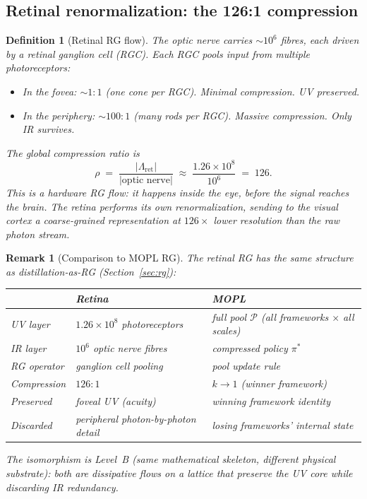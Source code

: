 \documentclass[11pt,a4paper]{article}
\newtheorem{definition}[theorem]{Definition}
\newtheorem{remark}[theorem]{Remark}
\newcommand{\cP}{\mathcal{P}}
\begin{document}
\subsection{Retinal renormalization: the 126:1 compression}
\label{app:retina-rg}

\begin{definition}[Retinal RG flow]\label{def:retina-rg}
The optic nerve carries $\sim\!10^6$ fibres, each driven
by a retinal ganglion cell (RGC).
Each RGC pools input from multiple photoreceptors:
\begin{itemize}[nosep]
\item In the fovea: $\sim\!1{:}1$ (one cone per RGC).
  Minimal compression.  UV preserved.
\item In the periphery: $\sim\!100{:}1$ (many rods per RGC).
  Massive compression.  Only IR survives.
\end{itemize}
The global compression ratio is
\[
  \rho
    \;=\; \frac{|\Lambda_{\mathrm{ret}}|}{|\text{optic nerve}|}
    \;\approx\; \frac{1.26 \times 10^8}{10^6}
    \;=\; 126.
\]
This is a \emph{hardware RG flow}: it happens inside the eye,
before the signal reaches the brain.
The retina performs its own renormalization, sending to the
visual cortex a coarse-grained representation at $126\times$
lower resolution than the raw photon stream.
\end{definition}

\begin{remark}[Comparison to MOPL RG]%
\label{rem:retina-mopl-rg}
The retinal RG has the same structure as distillation-as-RG
(Section~\ref{sec:rg}):
\begin{center}
\small
\begin{tabular}{@{}lll@{}}
\toprule
 & \textbf{Retina} & \textbf{MOPL} \\
\midrule
UV layer & $1.26 \times 10^8$ photoreceptors &
  full pool $\cP$ (all frameworks $\times$ all scales) \\
IR layer & $10^6$ optic nerve fibres &
  compressed policy $\pi^*$ \\
RG operator & ganglion cell pooling &
  pool update rule \\
Compression & $126{:}1$ & $k \to 1$
  (winner framework) \\
Preserved & foveal UV (acuity) &
  winning framework identity \\
Discarded & peripheral photon-by-photon detail &
  losing frameworks' internal state \\
\bottomrule
\end{tabular}
\end{center}
The isomorphism is Level~B (same mathematical skeleton,
different physical substrate):
both are dissipative flows on a lattice that preserve
the UV core while discarding IR redundancy.
\end{remark}
\end{document}
